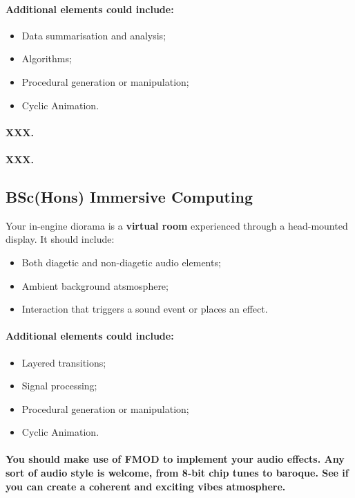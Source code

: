 \documentclass{../../fal_assignment}
\begin{document}
\paragraph{Additional elements could include:}
\begin{itemize}
\item Data summarisation and analysis;
\item Algorithms;
\item Procedural generation or manipulation; 
\item Cyclic Animation.
\end{itemize}
\paragraph{XXX.}

\paragraph{XXX.}

\subsection*{BSc(Hons) Immersive Computing}

Your in-engine diorama is a \textbf{virtual room} experienced through a head-mounted display. It should include:
\begin{itemize}
\item Both diagetic and non-diagetic audio elements;
\item Ambient background atsmosphere; 
\item Interaction that triggers a sound event or places an effect.
\end{itemize}
\paragraph{Additional elements could include:}
\begin{itemize}
\item Layered transitions;
\item Signal processing;
\item Procedural generation or manipulation; 
\item Cyclic Animation.
\end{itemize}
\paragraph{You should make use of FMOD to implement your audio effects. Any sort of audio style is welcome, from 8-bit chip tunes to baroque. See if you can create a coherent and exciting vibes atmosphere.}
\end{document}
